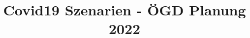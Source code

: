 \documentclass[11pt]{book}
\title{Covid19 Szenarien - ÖGD Planung 2022}
\author{}
\begin{document}
\maketitle
\def\title#1{\chapter{#1}}
\tableofcontents

        
        
        
        
        
        
        
        
        
        
        
        
        
        
        
        
        
        
        
        
\end{document}
